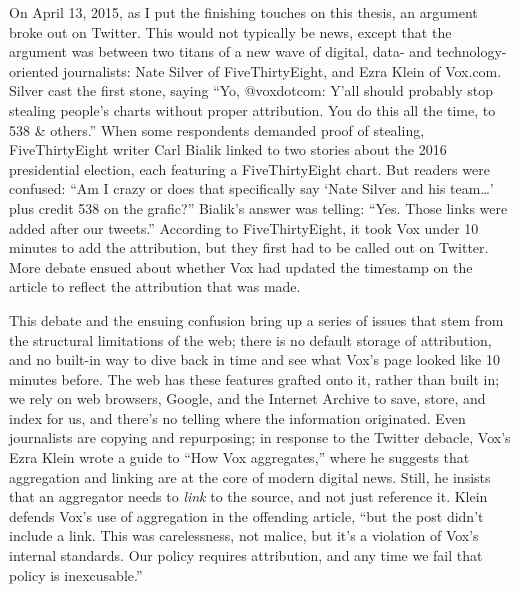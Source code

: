 On April 13, 2015, as I put the finishing touches on this thesis, an argument broke out on Twitter. This would not typically be news, except that the argument was between two titans of a new wave of digital, data- and technology-oriented journalists: Nate Silver of FiveThirtyEight, and Ezra Klein of Vox.com. Silver cast the first stone, saying ``Yo, @voxdotcom: Y'all should probably stop stealing people's charts without proper attribution. You do this all the time, to 538 \& others.''\autocite{silver_yo_2015} When some respondents demanded proof of stealing, FiveThirtyEight writer Carl Bialik linked to two stories about the 2016 presidential election, each featuring a FiveThirtyEight chart. But readers were confused: ``Am I crazy or does that specifically say `Nate Silver and his team\ldots' plus credit 538 on the grafic?'' Bialik's answer was telling: ``Yes. Those links were added after our tweets.''\autocite{bialik_samslusher_2015} According to FiveThirtyEight, it took Vox under 10 minutes to add the attribution, but they first had to be called out on Twitter. More debate ensued about whether Vox had updated the timestamp on the article to reflect the attribution that was made.

This debate and the ensuing confusion bring up a series of issues that stem from the structural limitations of the web; there is no default storage of attribution, and no built-in way to dive back in time and see what Vox's page looked like 10 minutes before. The web has these features grafted onto it, rather than built in; we rely on web browsers, Google, and the Internet Archive to save, store, and index for us, and there's no telling where the information originated. Even journalists are copying and repurposing; in response to the Twitter debacle, Vox's Ezra Klein wrote a guide to ``How Vox aggregates,'' where he suggests that aggregation and linking are at the core of modern digital news. Still, he insists that an aggregator needs to \emph{link} to the source, and not just reference it. Klein defends Vox's use of aggregation in the offending article, ``but the post didn't include a link. This was carelessness, not malice, but it's a violation of Vox's internal standards. Our policy requires attribution, and any time we fail that policy is inexcusable.''\autocite{klein_how_2015}

